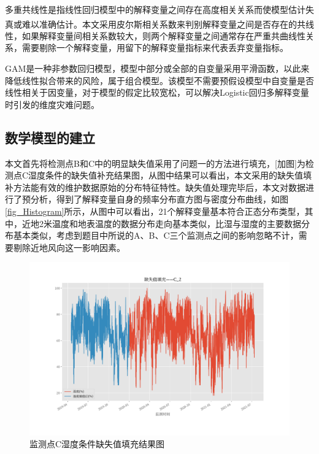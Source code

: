 \documentclass[a4paper,10pt]{my_paper}
\numberwithin{equation}{section}
\begin{document}
多重共线性是指线性回归模型中的解释变量之间存在高度相关关系而使模型估计失真或难以准确估计\textsuperscript{\cite{ref6}}。本文采用皮尔斯相关系数来判别解释变量之间是否存在的共线性，如果解释变量间相关系数较大，则两个解释变量之间通常存在严重共曲线性关系，需要剔除一个解释变量，用留下的解释变量指标来代表丢弃变量指标。

GAM是一种非参数回归模型，模型中部分或全部的自变量采用平滑函数，以此来降低线性拟合带来的风险，属于组合模型。该模型不需要预假设模型中自变量是否线性相关于因变量，对于模型的假定比较宽松，可以解决Logistic回归多解释变量时引发的维度灾难问题。

\subsection{数学模型的建立}
本文首先将检测点B和C中的明显缺失值采用了问题一的方法进行填充，{\color{red}[加图]}为检测点C湿度条件的缺失值补充结果图，从图中结果可以看出，本文采用的缺失值填补方法能有效的维护数据原始的分布特征特性。缺失值处理完毕后，本文对数据进行了预分析，得到了解释变量自身的频率分布直方图与密度分布曲线，如图\ref{fig_Histogram}所示，从图中可以看出，21个解释变量基本符合正态分布类型，其中，近地2米温度和地表温度的数据分布走向基本类似，比湿与湿度的主要数据分布基本类似，考虑到题目中所说的A、B、C三个监测点之间的影响忽略不计，需要剔除近地风向这一影响因素。

\begin{figure}
  \centering
  \includegraphics[width=.8\textwidth]{缺失值填充_C_2.pdf}
  \caption{监测点C湿度条件缺失值填充结果图}\label{fig_缺失C2}
\end{figure}
\end{document}
